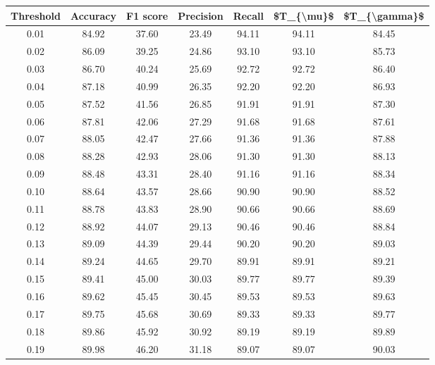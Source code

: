 \begin{tabular}{|c|c|c|c|c|c|c|}
\hline
 Threshold &  Accuracy &  F1 score &  Precision &  Recall &  \$T\_\{\textbackslash mu\}\$ &  \$T\_\{\textbackslash gamma\}\$ \\
\hline
      0.01 &     84.92 &     37.60 &      23.49 &   94.11 &      94.11 &         84.45 \\
      0.02 &     86.09 &     39.25 &      24.86 &   93.10 &      93.10 &         85.73 \\
      0.03 &     86.70 &     40.24 &      25.69 &   92.72 &      92.72 &         86.40 \\
      0.04 &     87.18 &     40.99 &      26.35 &   92.20 &      92.20 &         86.93 \\
      0.05 &     87.52 &     41.56 &      26.85 &   91.91 &      91.91 &         87.30 \\
      0.06 &     87.81 &     42.06 &      27.29 &   91.68 &      91.68 &         87.61 \\
      0.07 &     88.05 &     42.47 &      27.66 &   91.36 &      91.36 &         87.88 \\
      0.08 &     88.28 &     42.93 &      28.06 &   91.30 &      91.30 &         88.13 \\
      0.09 &     88.48 &     43.31 &      28.40 &   91.16 &      91.16 &         88.34 \\
      0.10 &     88.64 &     43.57 &      28.66 &   90.90 &      90.90 &         88.52 \\
      0.11 &     88.78 &     43.83 &      28.90 &   90.66 &      90.66 &         88.69 \\
      0.12 &     88.92 &     44.07 &      29.13 &   90.46 &      90.46 &         88.84 \\
      0.13 &     89.09 &     44.39 &      29.44 &   90.20 &      90.20 &         89.03 \\
      0.14 &     89.24 &     44.65 &      29.70 &   89.91 &      89.91 &         89.21 \\
      0.15 &     89.41 &     45.00 &      30.03 &   89.77 &      89.77 &         89.39 \\
      0.16 &     89.62 &     45.45 &      30.45 &   89.53 &      89.53 &         89.63 \\
      0.17 &     89.75 &     45.68 &      30.69 &   89.33 &      89.33 &         89.77 \\
      0.18 &     89.86 &     45.92 &      30.92 &   89.19 &      89.19 &         89.89 \\
      0.19 &     89.98 &     46.20 &      31.18 &   89.07 &      89.07 &         90.03 \\

\end{tabular}
